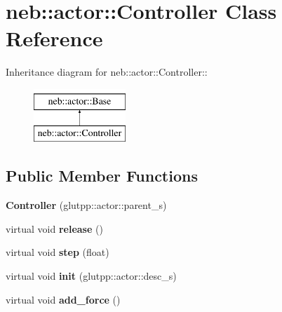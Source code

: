 \hypertarget{classneb_1_1actor_1_1Controller}{
\section{neb::actor::Controller Class Reference}
\label{classneb_1_1actor_1_1Controller}
}
Inheritance diagram for neb::actor::Controller::\begin{figure}[H]
\begin{center}
\leavevmode
\includegraphics[height=2cm]{classneb_1_1actor_1_1Controller}
\end{center}
\end{figure}
\subsection*{Public Member Functions}
\begin{DoxyCompactItemize}
\item 
\hypertarget{classneb_1_1actor_1_1Controller_aeedad5d671d8d4bc4398efd7be7fc005}{
{\bfseries Controller} (glutpp::actor::parent\_\-s)}
\label{classneb_1_1actor_1_1Controller_aeedad5d671d8d4bc4398efd7be7fc005}

\item 
\hypertarget{classneb_1_1actor_1_1Controller_ac6f5996da2aea174de794de4ffc647f4}{
virtual void {\bfseries release} ()}
\label{classneb_1_1actor_1_1Controller_ac6f5996da2aea174de794de4ffc647f4}

\item 
\hypertarget{classneb_1_1actor_1_1Controller_a95830d761987167e8ab122f3ca16346f}{
virtual void {\bfseries step} (float)}
\label{classneb_1_1actor_1_1Controller_a95830d761987167e8ab122f3ca16346f}

\item 
\hypertarget{classneb_1_1actor_1_1Controller_aad1420da60579f17c8dec8dad2a517bb}{
virtual void {\bfseries init} (glutpp::actor::desc\_\-s)}
\label{classneb_1_1actor_1_1Controller_aad1420da60579f17c8dec8dad2a517bb}

\item 
\hypertarget{classneb_1_1actor_1_1Controller_ab8ab78f513b014f112895de7dad43040}{
virtual void {\bfseries add\_\-force} ()}
\label{classneb_1_1actor_1_1Controller_ab8ab78f513b014f112895de7dad43040}

\end{DoxyCompactItemize}
